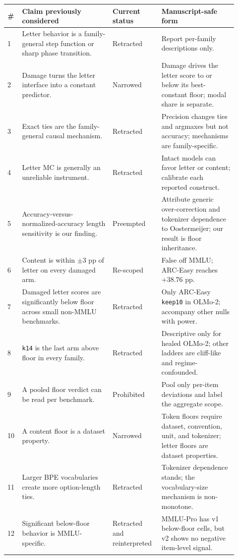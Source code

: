 \begin{table}[p]
\centering
\scriptsize
\setlength{\tabcolsep}{3.5pt}
\begin{tabular}{p{0.05\linewidth}p{0.37\linewidth}p{0.19\linewidth}p{0.31\linewidth}}
\toprule
\# & Claim previously considered & Current status & Manuscript-safe form \\
\midrule
1 & Letter behavior is a family-general step function or sharp phase transition. & Retracted & Report per-family descriptions only. \\
2 & Damage turns the letter interface into a constant predictor. & Narrowed & Damage drives the letter score to or below its best-constant floor; modal share is separate. \\
3 & Exact ties are the family-general causal mechanism. & Retracted & Precision changes ties and argmaxes but not accuracy; mechanisms are family-specific. \\
4 & Letter MC is generally an unreliable instrument. & Retracted & Intact models can favor letter or content; calibrate each reported construct. \\
5 & Accuracy-versus-normalized-accuracy length sensitivity is our finding. & Preempted & Attribute generic over-correction and tokenizer dependence to Oostermeijer; our result is floor inheritance. \\
6 & Content is within $\pm3$ pp of letter on every damaged arm. & Re-scoped & False off MMLU; ARC-Easy reaches $+38.76$ pp. \\
7 & Damaged letter scores are significantly below floor across small non-MMLU benchmarks. & Retracted & Only ARC-Easy \texttt{keep10} in OLMo-2; accompany other nulls with power. \\
8 & \texttt{k14} is the last arm above floor in every family. & Retracted & Descriptive only for healed OLMo-2; other ladders are cliff-like and regime-confounded. \\
9 & A pooled floor verdict can be read per benchmark. & Prohibited & Pool only per-item deviations and label the aggregate scope. \\
10 & A content floor is a dataset property. & Narrowed & Token floors require dataset, convention, unit, and tokenizer; letter floors are dataset properties. \\
11 & Larger BPE vocabularies create more option-length ties. & Retracted & Tokenizer dependence stands; the vocabulary-size mechanism is non-monotone. \\
12 & Significant below-floor behavior is MMLU-specific. & Retracted and reinterpreted & MMLU-Pro has v1 below-floor cells, but v2 shows no negative item-level signal. \\

\end{tabular}
\end{table}
